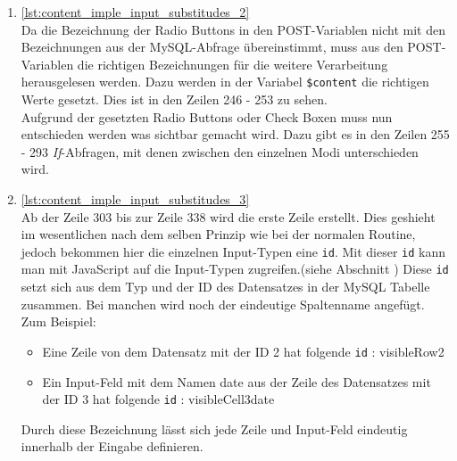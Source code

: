 \begin{enumerate}
\newpage

	
	
	\item \autoref{lst:content_imple_input_substitudes_2}\\
	Da die Bezeichnung der Radio Buttons in den POST-Variablen nicht mit den Bezeichnungen aus der MySQL-Abfrage übereinstimmt, muss aus den POST-Variablen die richtigen Bezeichnungen für die weitere Verarbeitung herausgelesen werden. Dazu werden in der Variabel \texttt{\$content} die richtigen Werte gesetzt. Dies ist in den Zeilen 246 - 253 zu sehen.\\
	Aufgrund der gesetzten Radio Buttons oder Check Boxen muss nun entschieden werden was sichtbar gemacht wird. Dazu gibt es in den Zeilen 255 - 293 \textit{If}-Abfragen, mit denen zwischen den einzelnen Modi unterschieden wird.\\ 
	
	
	\item \autoref{lst:content_imple_input_substitudes_3}\\
	Ab der Zeile 303 bis zur Zeile 338 wird die erste Zeile erstellt. Dies geshieht im wesentlichen nach dem selben Prinzip wie bei der normalen Routine, jedoch bekommen hier die einzelnen Input-Typen eine \texttt{id}. Mit dieser \texttt{id} kann man mit JavaScript auf die Input-Typen zugreifen.(siehe Abschnitt ) Diese \texttt{id} setzt sich aus dem Typ und der ID des Datensatzes in der MySQL Tabelle zusammen. Bei manchen wird noch der eindeutige Spaltenname angefügt.\\
	Zum Beispiel:
	\begin{itemize}
		\item Eine Zeile von dem Datensatz mit der ID 2 hat folgende \texttt{id} : visibleRow2
		\item Ein Input-Feld mit dem Namen date aus der Zeile des Datensatzes mit der ID 3 hat folgende \texttt{id} : visibleCell3date
	\end{itemize}
	Durch diese Bezeichnung lässt sich jede Zeile und Input-Feld eindeutig innerhalb der Eingabe definieren.\\
	

\end{enumerate}
